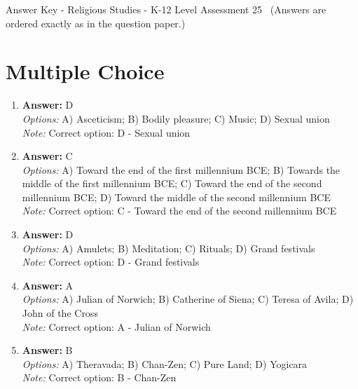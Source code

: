 \documentclass[12pt]{article}
\begin{document}
\begin{center}
Answer Key - Religious Studies - K-12 Level Assessment 25 \
\small (Answers are ordered exactly as in the question paper.)
\end{center}

\section*{Multiple Choice}
\begin{enumerate}[label=\arabic*.]
\item \textbf{Answer:} D
\\ \textit{Options:} A) Asceticism; B) Bodily pleasure; C) Music; D) Sexual union
\\ \textit{Note:} Correct option: D - Sexual union
\item \textbf{Answer:} C
\\ \textit{Options:} A) Toward the end of the first millennium BCE; B) Towards the middle of the first millennium BCE; C) Toward the end of the second millennium BCE; D) Toward the middle of the second millennium BCE
\\ \textit{Note:} Correct option: C - Toward the end of the second millennium BCE
\item \textbf{Answer:} D
\\ \textit{Options:} A) Amulets; B) Meditation; C) Rituals; D) Grand festivals
\\ \textit{Note:} Correct option: D - Grand festivals
\item \textbf{Answer:} A
\\ \textit{Options:} A) Julian of Norwich; B) Catherine of Siena; C) Teresa of Avila; D) John of the Cross
\\ \textit{Note:} Correct option: A - Julian of Norwich
\item \textbf{Answer:} B
\\ \textit{Options:} A) Theravada; B) Chan-Zen; C) Pure Land; D) Yogicara
\\ \textit{Note:} Correct option: B - Chan-Zen
\end{enumerate}
\end{document}
